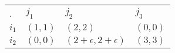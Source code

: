 \begin{center}
    \begin{tabular}{llll}
    .                          & $j_1$    & $j_2$                      & $j_3$                           \\ \cline{2-4}
    \multicolumn{1}{l|}{$i_1$} & $(1, 1)$ & $(2, 2)$                   & \multicolumn{1}{l|}{$(0, 0)$} \\
    \multicolumn{1}{l|}{$i_2$} & $(0, 0)$ & $(2+\epsilon, 2+\epsilon)$ & \multicolumn{1}{l|}{$(3, 3)$} \\ \cline{2-4}
    \end{tabular}
\end{center}